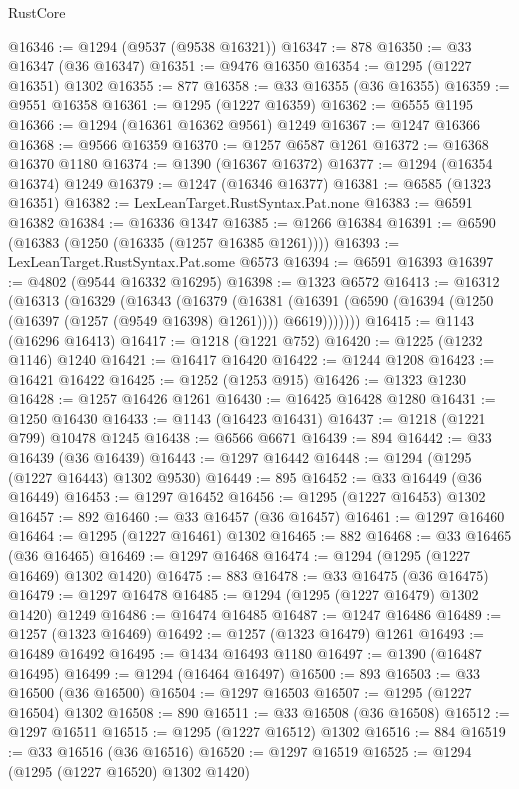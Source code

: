 \begin{lexlean}{RustCore}
\begin{coremodule}
@16346 := @1294 (@9537 (@9538 @16321))
@16347 := 878
@16350 := @33 @16347 (@36 @16347)
@16351 := @9476 @16350
@16354 := @1295 (@1227 @16351) @1302
@16355 := 877
@16358 := @33 @16355 (@36 @16355)
@16359 := @9551 @16358
@16361 := @1295 (@1227 @16359)
@16362 := @6555 @1195
@16366 := @1294 (@16361 @16362 @9561) @1249
@16367 := @1247 @16366
@16368 := @9566 @16359
@16370 := @1257 @6587 @1261
@16372 := @16368 @16370 @1180
@16374 := @1390 (@16367 @16372)
@16377 := @1294 (@16354 @16374) @1249
@16379 := @1247 (@16346 @16377)
@16381 := @6585 (@1323 @16351)
@16382 := LexLeanTarget.RustSyntax.Pat.none
@16383 := @6591 @16382
@16384 := @16336 @1347
@16385 := @1266 @16384
@16391 := @6590 (@16383 (@1250 (@16335 (@1257 @16385 @1261))))
@16393 := LexLeanTarget.RustSyntax.Pat.some @6573
@16394 := @6591 @16393
@16397 := @4802 (@9544 @16332 @16295)
@16398 := @1323 @6572
@16413 := @16312
    (@16313
      (@16329
        (@16343
          (@16379
            (@16381
              (@16391 (@6590 (@16394 (@1250 (@16397 (@1257 (@9549 @16398) @1261)))) @6619)))))))
@16415 := @1143 (@16296 @16413)
@16417 := @1218 (@1221 @752)
@16420 := @1225 (@1232 @1146) @1240
@16421 := @16417 @16420
@16422 := @1244 @1208
@16423 := @16421 @16422
@16425 := @1252 (@1253 @915)
@16426 := @1323 @1230
@16428 := @1257 @16426 @1261
@16430 := @16425 @16428 @1280
@16431 := @1250 @16430
@16433 := @1143 (@16423 @16431)
@16437 := @1218 (@1221 @799) @10478 @1245
@16438 := @6566 @6671
@16439 := 894
@16442 := @33 @16439 (@36 @16439)
@16443 := @1297 @16442
@16448 := @1294 (@1295 (@1227 @16443) @1302 @9530)
@16449 := 895
@16452 := @33 @16449 (@36 @16449)
@16453 := @1297 @16452
@16456 := @1295 (@1227 @16453) @1302
@16457 := 892
@16460 := @33 @16457 (@36 @16457)
@16461 := @1297 @16460
@16464 := @1295 (@1227 @16461) @1302
@16465 := 882
@16468 := @33 @16465 (@36 @16465)
@16469 := @1297 @16468
@16474 := @1294 (@1295 (@1227 @16469) @1302 @1420)
@16475 := 883
@16478 := @33 @16475 (@36 @16475)
@16479 := @1297 @16478
@16485 := @1294 (@1295 (@1227 @16479) @1302 @1420) @1249
@16486 := @16474 @16485
@16487 := @1247 @16486
@16489 := @1257 (@1323 @16469)
@16492 := @1257 (@1323 @16479) @1261
@16493 := @16489 @16492
@16495 := @1434 @16493 @1180
@16497 := @1390 (@16487 @16495)
@16499 := @1294 (@16464 @16497)
@16500 := 893
@16503 := @33 @16500 (@36 @16500)
@16504 := @1297 @16503
@16507 := @1295 (@1227 @16504) @1302
@16508 := 890
@16511 := @33 @16508 (@36 @16508)
@16512 := @1297 @16511
@16515 := @1295 (@1227 @16512) @1302
@16516 := 884
@16519 := @33 @16516 (@36 @16516)
@16520 := @1297 @16519
@16525 := @1294 (@1295 (@1227 @16520) @1302 @1420)

\end{coremodule}
\end{lexlean}
